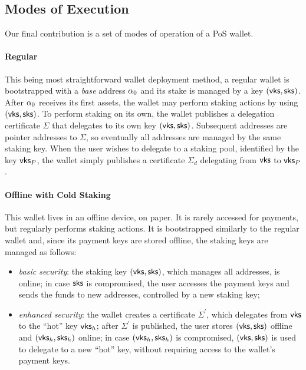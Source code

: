 \subsection{Modes of Execution}\label{sec:wallet-modes}

Our final contribution is a set of modes of operation of a PoS wallet.

\paragraph{Regular}
This being most straightforward wallet deployment method, a regular wallet is
bootstrapped with a \emph{base} address $\alpha_0$ and its stake is managed by a
key $(\mathsf{vks}, \mathsf{sks})$. After $\alpha_0$ receives its first assets, the wallet
may perform staking actions by using $(\mathsf{vks}, \mathsf{sks})$. To perform staking on
its own, the wallet publishes a delegation certificate $\Sigma$ that delegates
to its own key $(\mathsf{vks}, \mathsf{sks})$. Subsequent addresses are pointer addresses to
$\Sigma$, so eventually all addresses are managed by the same staking key.
When the user wishes to delegate to a staking pool, identified by the key
$\mathsf{vks}_P$, the wallet simply publishes a certificate $\Sigma_d$
delegating from $\mathsf{vks}$ to $\mathsf{vks}_P$.

\paragraph{Offline with Cold Staking}
This wallet lives in an offline device, \eg on paper. It is rarely accessed for
payments, but regularly performs staking actions. It is bootstrapped similarly
to the regular wallet and, since its payment keys are stored offline, the
staking keys are managed as follows:
\begin{itemize}
    \item \emph{basic security}: the staking key $(\mathsf{vks}, \mathsf{sks})$, which
        manages all addresses, is online; in case $\mathsf{sks}$ is
        compromised, the user accesses the payment keys and sends the funds to
        new addresses, controlled by a new staking key;
    \item \emph{enhanced security}: the wallet creates a certificate
        $\Sigma^\prime$, which delegates from $\mathsf{vks}$ to the
        ``hot'' key $\mathsf{vks}_h$; after $\Sigma^\prime$ is published,
        the user stores $(\mathsf{vks}, \mathsf{sks})$ offline and $(\mathsf{vks}_h,
        \mathsf{sks}_h)$ online; in case $(\mathsf{vks}_h,
        \mathsf{sks}_h)$ is compromised, $(\mathsf{vks}, \mathsf{sks})$ is used to
        delegate to a new ``hot'' key, without requiring access to the wallet's
        payment keys.
\end{itemize}

